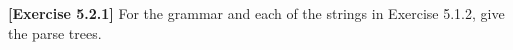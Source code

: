 \textbf{[Exercise 5.2.1]} For the grammar and each of the strings in 
Exercise 5.1.2, give the parse trees.
